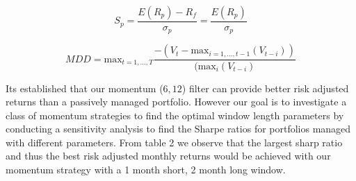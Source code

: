 \documentclass{article}
\begin{document}
\begin{equation}\label{eq:5}
    S_{p}=\frac{E(R_{p})-R_{f}}{\sigma_{p}}=\frac{E(R_{p})}{\sigma_{p}}
\end{equation}

\begin{equation}\label{eq:6}
        MDD = \text{max}_{t=1,...,T}\frac{-(V_{t}-\text{max}_{i=1,...,t-1}(V_{t-i}))}{(\text{max}_{i}(V_{t-i})}
\end{equation}

Its established that our momentum ($6,12$) filter can provide better risk adjusted returns than a passively managed portfolio. However our goal is to investigate a class of momentum strategies to find the optimal window length parameters by conducting a sensitivity analysis to find the Sharpe ratios for portfolios managed with different parameters. From table 2 we observe that the largest sharp ratio and thus the best risk adjusted monthly returns would be achieved with our momentum strategy with a 1 month short, 2 month long window.
\end{document}
